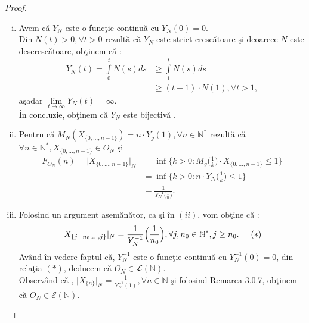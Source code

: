 \documentclass[ a4paper, 12pt]{report}
\theoremstyle{remark}
\numberwithin{equation}{section}
\begin{document}
\begin{proof}
\begin{enumerate}[(i)]
\item Avem c\u a $Y_N$ este o func\c tie continu\u a cu $Y_N(0) = 0$.\\
Din $N(t) > 0, \forall t >0$ rezult\u a c\u a $Y_N$ este strict cresc\u atoare \c si deoarece $N$ este descresc\u atoare, ob\c tinem c\u a :
\begin{align*}
Y_N(t)  = \int\limits_{0}^{t} N(s) ds &\geq \int\limits_{1}^{t} N(s) ds \\
&\geq (t-1) \cdot N(1), \forall t > 1,
\end{align*}
 a\c sadar $\lim\limits_{t \rightarrow \infty} Y_N(t) = \infty.$\\
\^In concluzie, ob\c tinem c\u a $Y_N$ este bijectiv\u a .
\item Pentru c\u a $M_N(X_{\{0, \ldots, n-1\}}) = n \cdot Y_g(1), \forall n \in \mathbb{N}^{\ast}$ rezult\u a c\u a \\
$\forall n \in \mathbb{N}^{\ast}, X_{\{0, \ldots, n-1\}} \in O_N$ \c si
\begin{align*}
F_{O_{N}}(n) = \lvert X_{\{0,\ldots, n-1\}}\rvert_{N} &= \inf\{k >0 : M_g\Big(\frac{1}{k}\Big) \cdot X_{\{0, \ldots, n-1\}}\leq 1 \}\\
 &= \inf\{ k>0 : n \cdot Y_N\Big(\frac{1}{k}\Big) \leq 1  \}\\
  &= \frac{1}{Y_N^{-1}\Big(\frac{1}{n}\Big)}.
\end{align*}
\item Folosind un argument asem\u an\u ator, ca \c si \^in $(ii)$, vom ob\c tine c\u a :
\[ \lvert X_{\{ j-n_0, \ldots , j \}} \rvert_{N} = \frac{1}{Y_N^{-1}}\Big(\frac{1}{n_0}\Big), \forall j,n_0 \in \mathbb{N}^{\ast}, j \geq n_0. \hspace{5mm} (\ast)\]
Av\^and \^in vedere faptul c\u a, $Y_N^{-1}$ este o func\c tie continu\u a cu $Y_N^{-1}(0) = 0$, din rela\c tia $(\ast)$, deducem c\u a $O_N \in \mathcal{L}(\mathbb{N}).$\\
Observ\^and c\u a , $\lvert X_{\{ n \}} \rvert_{N} = \frac{1}{Y_N^{-1}(1)}, \forall n \in \mathbb{N}$ \c si folosind Remarca 3.0.7, ob\c tinem c\u a $O_N \in \mathcal{E}(\mathbb{N}).$\\
\end{enumerate}
\end{proof}
\end{document}
